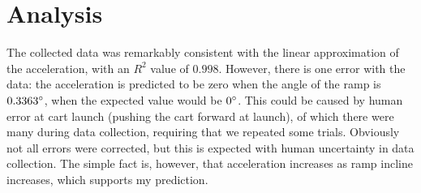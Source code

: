 \documentclass[a4paper]{article}
\begin{document}
    \section{Analysis}
        The collected data was remarkably consistent with the linear approximation
        of the acceleration, with an \(R^{2}\) value of \(0.998\). However, there
        is one error with the data: the acceleration is predicted to be zero when
        the angle of the ramp is \(0.3363\degree\), when the expected value would
        be \(0\degree\). This could be caused by human error at cart launch (pushing
        the cart forward at launch), of which there were many during data collection,
        requiring that we repeated some trials. Obviously not all errors were
        corrected, but this is expected with human uncertainty in data collection.
        The simple fact is, however, that acceleration increases as ramp incline
        increases, which supports my prediction.
\end{document}

